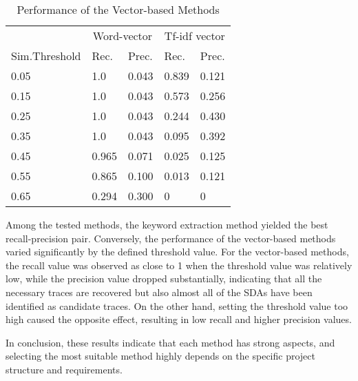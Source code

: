 \begin{table}[htb]
\centering
\caption{Performance of the Vector-based Methods}
\label{tab:vecperf}
\begin{tabular}{lllll}
\toprule
  & \multicolumn{2}{c}{Word-vector} &  \multicolumn{2}{c}{Tf-idf vector} \\
  \cmidrule{2-5}
{Sim.Threshold   } & {Rec.} & {Prec.} &  {Rec.} & {Prec.}\\
\midrule
0.05    & 1.0 & 0.043 & 0.839 & 0.121 \\
0.15    & 1.0 & 0.043 & 0.573 & 0.256 \\
0.25    & 1.0 & 0.043 & 0.244 & 0.430 \\
0.35    & 1.0 & 0.043 & 0.095 & 0.392 \\
0.45    & 0.965 & 0.071 & 0.025 & 0.125 \\
0.55    & 0.865 & 0.100 & 0.013 & 0.121 \\
0.65    & 0.294 & 0.300 & 0 & 0 \\
\bottomrule
\end{tabular}
\end{table}

Among the tested methods, the keyword extraction method yielded the best recall-precision pair. Conversely, the performance of the vector-based methods varied significantly by the defined threshold value. For the vector-based methods, the recall value was observed as close to 1 when the threshold value was relatively low, while the precision value dropped substantially, indicating that all the necessary traces are recovered but also almost all of the SDAs have been identified as candidate traces. On the other hand, setting the threshold value too high caused the opposite effect, resulting in low recall and higher precision values.

In conclusion, these results indicate that each method has strong aspects, and selecting the most suitable method highly depends on the specific project structure and requirements.

